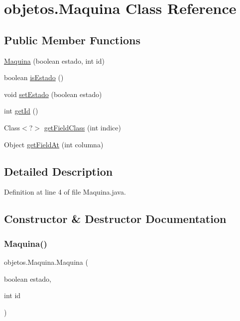 \hypertarget{classobjetos_1_1_maquina}{}\section{objetos.\+Maquina Class Reference}
\label{classobjetos_1_1_maquina}
\subsection*{Public Member Functions}
\begin{DoxyCompactItemize}
\item 
\mbox{\hyperlink{classobjetos_1_1_maquina_abe32f06ca4367bea60d592d504a7a359}{Maquina}} (boolean estado, int id)
\item 
boolean \mbox{\hyperlink{classobjetos_1_1_maquina_a03b4c97926e8db81a5a28459293c16b6}{is\+Estado}} ()
\item 
void \mbox{\hyperlink{classobjetos_1_1_maquina_a8a5d703c85d9a8a4a7ff352b01ff085b}{set\+Estado}} (boolean estado)
\item 
int \mbox{\hyperlink{classobjetos_1_1_maquina_aca30cab810f1072e9ab07024d6f97cc6}{get\+Id}} ()
\item 
Class$<$?$>$ \mbox{\hyperlink{classobjetos_1_1_maquina_a8ecfb51ac52f34402a48c572aa710297}{get\+Field\+Class}} (int indice)
\item 
Object \mbox{\hyperlink{classobjetos_1_1_maquina_ab50c4dec88d2de79313a9a369df0ffd3}{get\+Field\+At}} (int columna)
\end{DoxyCompactItemize}


\subsection{Detailed Description}


Definition at line 4 of file Maquina.\+java.



\subsection{Constructor \& Destructor Documentation}
\mbox{\label{classobjetos_1_1_maquina_abe32f06ca4367bea60d592d504a7a359}} 
\subsubsection{\texorpdfstring{Maquina()}{Maquina()}}
{\footnotesize\ttfamily objetos.\+Maquina.\+Maquina (\begin{DoxyParamCaption}\item[{boolean}]{estado,  }\item[{int}]{id }\end{DoxyParamCaption})}



